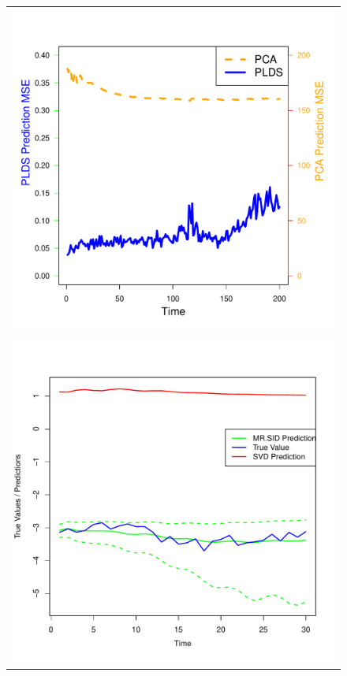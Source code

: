\documentclass[times,twocolumn,final,authoryear]{elsarticle}
\begin{document}
\begin{figure}
\centering
\vspace*{-5mm}
\begin{tabular}{c}
\includegraphics[scale=0.425]{hcp_pred_accy.pdf}\\
\vspace*{-5mm}
\includegraphics[scale=0.425]{newSampleTS.pdf}\\

\end{tabular}
\end{figure}
\end{document}
